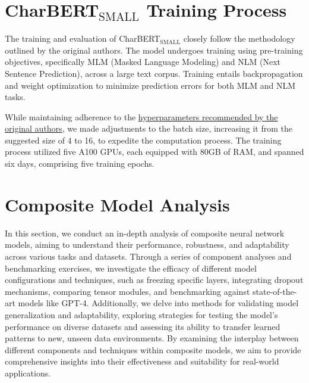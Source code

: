\section{CharBERT$_{\text{SMALL}}$ Training Process}
\label{sec:4_charbert_training_process}
The training and evaluation of CharBERT$_{\text{SMALL}}$ closely follow the methodology outlined by the original authors. The model undergoes training using pre-training objectives, specifically MLM (Masked Language Modeling) and NLM (Next Sentence Prediction), across a large text corpus. Training entails backpropagation and weight optimization to minimize prediction errors for both MLM and NLM tasks.

While maintaining adherence to the \href{https://github.com/mawentao277/CharBERT/blob/main/shell/mlm.sh}{hyperparameters recommended by the original authors}, we made adjustments to the batch size, increasing it from the suggested size of 4 to 16, to expedite the computation process. The training process utilized five A100 GPUs, each equipped with 80GB of RAM, and spanned six days, comprising five training epochs.
\section{Composite Model Analysis}
\label{sec:4_composite_model_analysis}
In this section, we conduct an in-depth analysis of composite neural network models, aiming to understand their performance, robustness, and adaptability across various tasks and datasets. Through a series of component analyses and benchmarking exercises, we investigate the efficacy of different model configurations and techniques, such as freezing specific layers, integrating dropout mechanisms, comparing tensor modules, and benchmarking against state-of-the-art models like GPT-4. Additionally, we delve into methods for validating model generalization and adaptability, exploring strategies for testing the model's performance on diverse datasets and assessing its ability to transfer learned patterns to new, unseen data environments. By examining the interplay between different components and techniques within composite models, we aim to provide comprehensive insights into their effectiveness and suitability for real-world applications.

